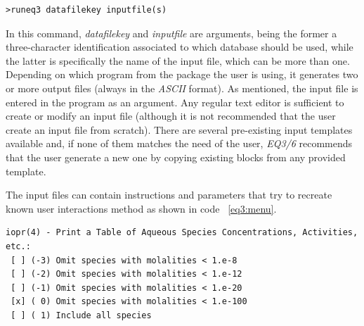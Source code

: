 \begin{lstlisting}[frame=single, caption=Running EQ3 in \emph{EQ3/6} package, label=eq3:run]
>runeq3 datafilekey inputfile(s)
\end{lstlisting}

In this command, \emph{datafilekey} and \emph{inputfile} are arguments, being the former a three-character identification associated to which database should be used, while the latter is specifically the name of the input file, which can be more than one. Depending on which program from the package the user is using, it generates two or more output files (always in the \emph{ASCII} format).
As mentioned, the input file is entered in the program as an argument. Any regular text editor is sufficient to create or modify an input file (although it is not recommended that the user create an input file from scratch). There are several pre-existing input templates available and, if none of them matches the need of the user, \emph{EQ3/6} recommends that the user generate a new one by copying existing blocks from any provided template.

The input files can contain instructions and parameters that try to recreate known user interactions method as shown in code ~\ref{eq3:menu}.

\begin{minipage}[c]{0.92\textwidth}
\begin{lstlisting}[frame=single, caption=Menu Option inside \emph{EQ3/6} input files that mimics a "radio button", label=eq3:menu]
iopr(4) - Print a Table of Aqueous Species Concentrations, Activities, etc.: 
 [ ] (-3) Omit species with molalities < 1.e-8 
 [ ] (-2) Omit species with molalities < 1.e-12 
 [ ] (-1) Omit species with molalities < 1.e-20 
 [x] ( 0) Omit species with molalities < 1.e-100 
 [ ] ( 1) Include all species 
\end{lstlisting}
\end{minipage}

